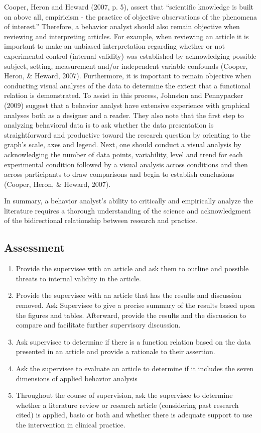 Cooper, Heron and Heward (2007, p. 5), assert that ``scientific knowledge is built on above all, empiricism - the practice of objective observations of the phenomena of interest.'' Therefore, a behavior analyst should also remain objective when reviewing and interpreting articles.  For example, when reviewing an article it is important to make an unbiased interpretation regarding whether or not experimental control (internal validity) was established by acknowledging possible subject, setting, measurement and/or independent variable confounds (Cooper, Heron, \& Heward, 2007). Furthermore, it is important to remain objective when conducting visual analyses of the data to determine the extent that a functional relation is demonstrated. To assist in this process, Johnston and Pennypacker (2009) suggest that a behavior analyst have extensive experience with graphical analyses both as a designer and a reader.  They also note that the first step to analyzing behavioral data is to ask whether the data presentation is straightforward and productive toward the research question by orienting to the graph's scale, axes and legend.  Next, one should conduct a visual analysis by acknowledging the number of data points, variability, level and trend for each experimental condition followed by a visual analysis across conditions  and then across participants to draw comparisons and begin to establish conclusions (Cooper, Heron, \& Heward, 2007).

     In summary, a behavior analyst's ability to critically and empirically analyze the literature requires a thorough understanding of the science and acknowledgment of the bidirectional relationship between research and practice. 
%
\subsection{Assessment}
\begin{enumerate}
\item Provide the supervisee with an article and ask them to outline and possible threats to internal validity in the article. 
\item Provide the supervisee with an article that has the results and discussion removed. Ask Supervisee to give a precise summary of the results based upon the figures and tables. Afterward, provide the results and the discussion to compare and facilitate further supervisory discussion. 
\item Ask supervisee to determine if there is a function relation based on the data presented in an article and provide a rationale to their assertion. 
\item Ask the supervisee to evaluate an article to determine if it includes the seven dimensions of applied behavior analysis
\item Throughout the course of supervision, ask the supervisee to determine whether a literature review or research article (considering past research cited) is applied, basic or both and whether there is adequate support to use the intervention in clinical practice. 
\end{enumerate}
%
